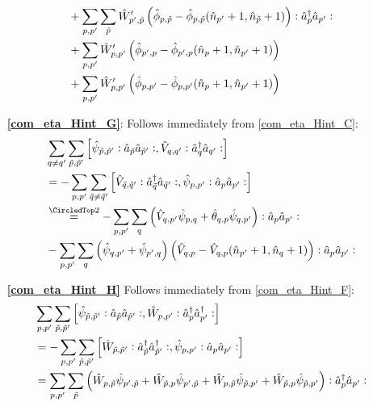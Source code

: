 \begin{appendix}
\begin{itemize}
\begin{align}
&+\sum\limits_{p, p^\prime}\sum\limits_{\tilde p}\hat W_{p^\prime,\tilde p}^\prime \left(\hat\phi_{p, \tilde p}-\hat\phi_{p, \tilde p}(\hat n_{p^\prime}+1,\hat n_{\tilde p}+1)\right)\vcentcolon\hat a^\dagger_{p}\hat a_{p^\prime}\vcentcolon \nonumber\\
&+\sum\limits_{p, p^\prime}\hat W_{p,p^\prime}^\prime \left(\hat\phi_{p^\prime,p}-\hat\phi_{p^\prime,p}(\hat n_p+1,\hat n_{p^\prime}+1)\right) \nonumber\\
&+\sum\limits_{p, p^\prime}\hat W_{p,p^\prime}^\prime \left(\hat\phi_{ p, p^\prime}-\hat\phi_{ p, p^\prime}(\hat n_p+1,\hat n_{p^\prime}+1)\right)\nonumber
\end{align}
\item[\textbf{\ref{com_eta_Hint_G}}:] Follows immediately from \ref{com_eta_Hint_C}:
\begin{subequations}
\begin{align}
&\Sum_{q\neq q^\prime}\Sum_{\tilde p,\tilde p^\prime} \left[\hat\psi_{\tilde p,\tilde p^\prime}\NO\AN_{\tilde p}\AN_{\tilde p^\prime}\NO,\hat V_{q,q^\prime}\NO\CR_q\AN_{q^\prime}\NO\right]\nonumber\\
&=-\Sum_{p,p^\prime} \Sum_{\tilde q\neq \tilde q^\prime}\left[\hat V_{\tilde q,\tilde q^\prime}\NO\CR_{\tilde q}\AN_{\tilde q^\prime}\NO,\hat\psi_{p,p^\prime}\NO\AN_{p}\AN_{p^\prime}\NO\right]\nonumber\\
&\eqsec -\Sum_{p, p^\prime}\Sum_{q}\left(\hat V_{ q, p^\prime}\hat \psi_{p,q}+\hat\theta_{ q, p}\hat \psi_{q,p^\prime}\right)\NO\AN_{p}\AN_{p^\prime}\NO\\
&-\Sum_{p, p^\prime}\Sum_{q}\left(\hat \psi_{q,p^\prime}+\hat \psi_{p^\prime,q}\right) \left(\hat V_{ q,p}-\hat V_{ q,p}(\hat n_{p^\prime}+1,\hat n_{q}+1)\right)\NO\AN_{p}\AN_{p^\prime}\NO\nonumber
\end{align}
\end{subequations}
\item[\textbf{\ref{com_eta_Hint_H}}] Follows immediately from \ref{com_eta_Hint_F}:
\begin{align}
&\Sum_{p, p^\prime}\Sum_{\tilde p,\tilde p^\prime} \left[\hat\psi_{\tilde p,\tilde p^\prime}\NO\AN_{\tilde p}\AN_{\tilde p^\prime}\NO,\hat W_{p,p^\prime}\NO\CR_p\CR_{p^\prime}\NO\right]\nonumber\\
&=-\Sum_{p, p^\prime}\Sum_{\tilde p,\tilde p^\prime} \left[\hat W_{\tilde p,\tilde p^\prime}\NO\CR_{\tilde p}\CR_{\tilde p^\prime}\NO,\hat\psi_{p, p^\prime}\NO\AN_{p}\AN_{p^\prime}\NO\right]\\
&=\Sum_{p, p^\prime}\Sum_{\tilde p} \left(\hat W_{p,\tilde p}\hat \psi_{p^\prime,\tilde p}+\hat W_{\tilde p,p}\hat \psi_{p^\prime,\tilde p}+\hat W_{p,\tilde p}\hat \psi_{\tilde p,p^\prime}  + \hat W_{\tilde p,p}\hat \psi_{\tilde p,p^\prime}\right)\NO\CR_{p}\AN_{p^\prime}\NO \\

\end{align}
\end{itemize}
\end{appendix}
